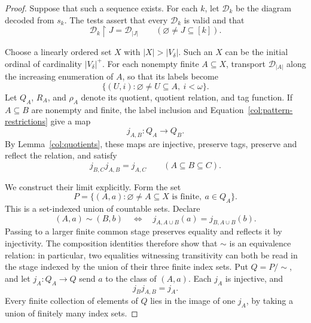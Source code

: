 \begin{proof}
Suppose that such a sequence exists.  For each \(k\), let
\(\mathcal D_k\) be the diagram decoded from \(s_k\).
The tests assert that every \(\mathcal D_k\) is valid and that
\begin{equation}\label{col:pattern-restrictions}
 \mathcal D_k\restriction J=\mathcal D_{|J|}
       \qquad(\varnothing\ne J\subseteq[k]).
\end{equation}

Choose a linearly ordered set \(X\) with
\(|X|>|V_\delta|\).  Such an \(X\) can be the initial ordinal
of cardinality \(|V_\delta|^+\).  For each nonempty finite
\(A\subseteq X\), transport \(\mathcal D_{|A|}\) along the
increasing enumeration of \(A\), so that its labels become
\[
                 \{(U,i):\varnothing\ne U\subseteq A,\ i<\omega\}.
\]
Let \(Q_A\), \(R_A\), and \(\rho_A\) denote its quotient,
quotient relation, and tag function.
If \(A\subseteq B\) are nonempty and finite, the label inclusion
and Equation~\eqref{col:pattern-restrictions} give a map
\[
                         j_{A,B}:Q_A\longrightarrow Q_B.
\]
By Lemma~\ref{col:quotients}, these maps are injective, preserve
tags, preserve and reflect the relation, and satisfy
\[
                     j_{B,C}j_{A,B}=j_{A,C}
                     \qquad(A\subseteq B\subseteq C).
\]

We construct their limit explicitly.  Form the set
\[
       P=\{(A,a):\varnothing\ne A\subseteq X
                        \text{ is finite},\ a\in Q_A\}.
\]
This is a set-indexed union of countable sets.  Declare
\begin{equation}\label{col:limit-equivalence}
 (A,a)\sim(B,b)
 \quad\Longleftrightarrow\quad
 j_{A,A\cup B}(a)=j_{B,A\cup B}(b).
\end{equation}
Passing to a larger finite common stage preserves equality
and reflects it by injectivity.  The composition identities
therefore show that \(\sim\) is an equivalence relation:
in particular, two equalities witnessing transitivity can
both be read in the stage indexed by the union of their
three finite index sets.  Put \(Q=P/{\sim}\), and let
\(j_A:Q_A\to Q\) send \(a\) to the class of \((A,a)\).
Each \(j_A\) is injective, and
\[
                         j_Bj_{A,B}=j_A.
\]
Every finite collection of elements of \(Q\) lies in the
image of one \(j_A\), by taking a union of finitely many
index sets.


\end{proof}
